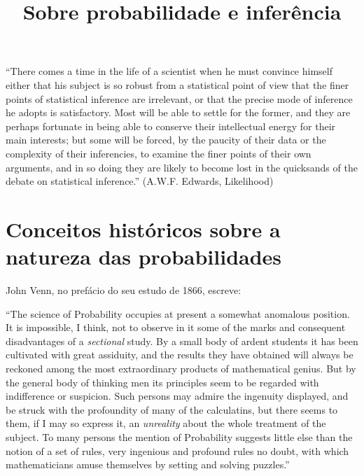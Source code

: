 \documentclass[12pt,a4paper]{article}
\begin{document}
\title{Sobre probabilidade e inferência}
\maketitle

``There comes a time in the life of a scientist when he must convince himself
either that his subject is so robust from a statistical point of view that
the finer points of statistical inference are irrelevant, or that the precise
mode of inference he adopts is satisfactory. Most will be able to settle for
the former, and they are perhaps fortunate in being able to conserve their
intellectual energy for their main interests; but some will be forced, by the
paucity of their data or the complexity of their inferencies, to examine
the finer points of their own arguments, and in so doing they are likely
to become lost in the quicksands of the debate on statistical inference.''
(A.W.F. Edwards, Likelihood)

\section{Conceitos históricos sobre a natureza das probabilidades}
John Venn, no prefácio do seu estudo de 1866, escreve:

``The science of Probability occupies at present a somewhat anomalous position. It is impossible, I think, not to observe
in it some of the marks and consequent disadvantages of a {\em sectional} study. By a small body of ardent students it
has been cultivated with great assiduity, and the results they have obtained will always be reckoned among the most 
extraordinary products of mathematical genius. But by the general body of thinking men its principles seem to be regarded
with indifference or suspicion. Such persons may admire the ingenuity displayed, and be struck with the profoundity
of many of the calculatins, but there seems to them, if I may so express it, an {\em unreality} about the whole treatment
of the subject. To many persons the mention of Probability suggests little else than the notion of a set of rules, very
ingenious and profound rules no doubt, with which mathematicians amuse themselves by setting and solving puzzles.''
\cite{Venn1866}
\end{document}
